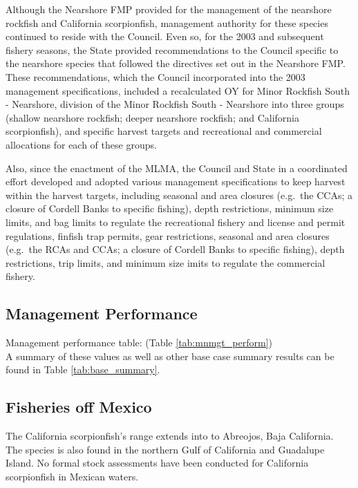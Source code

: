 \documentclass[12pt,]{article}
\begin{document}
Although the Nearshore FMP provided for the management of the nearshore
rockfish and California scorpionfish, management authority for these
species continued to reside with the Council. Even so, for the 2003 and
subsequent fishery seasons, the State provided recommendations to the
Council specific to the nearshore species that followed the directives
set out in the Nearshore FMP. These recommendations, which the Council
incorporated into the 2003 management specifications, included a
recalculated OY for Minor Rockfish South - Nearshore, division of the
Minor Rockfish South - Nearshore into three groups (shallow nearshore
rockfish; deeper nearshore rockfish; and California scorpionfish), and
specific harvest targets and recreational and commercial allocations for
each of these groups.

Also, since the enactment of the MLMA, the Council and State in a
coordinated effort developed and adopted various management
specifications to keep harvest within the harvest targets, including
seasonal and area closures (e.g.~the CCAs; a closure of Cordell Banks to
specific fishing), depth restrictions, minimum size limits, and bag
limits to regulate the recreational fishery and license and permit
regulations, finfish trap permits, gear restrictions, seasonal and area
closures (e.g.~the RCAs and CCAs; a closure of Cordell Banks to specific
fishing), depth restrictions, trip limits, and minimum size imits to
regulate the commercial fishery.

\subsection{Management Performance}\label{management-performance-1}

Management performance table: (Table \ref{tab:mnmgt_perform})\\
A summary of these values as well as other base case summary results can
be found in Table \ref{tab:base_summary}.

\subsection{Fisheries off Mexico}\label{fisheries-off-mexico}

The California scorpionfish's range extends into to Abreojos, Baja
California.\\
The species is also found in the northern Gulf of California and
Guadalupe Island. No formal stock assessments have been conducted for
California scorpionfish in Mexican waters.
\end{document}

